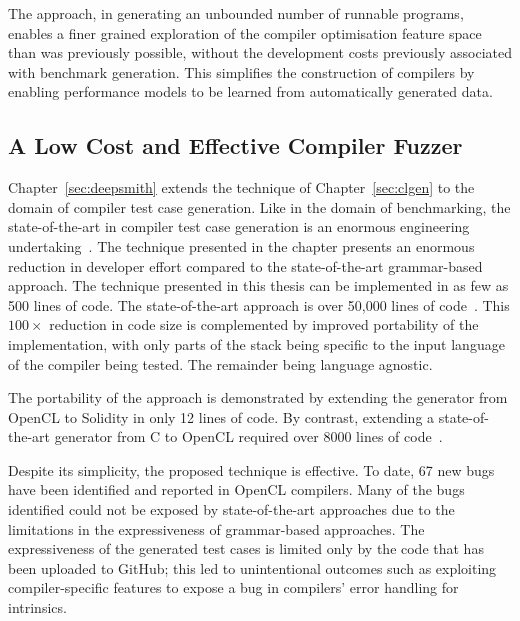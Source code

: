 The approach, in generating an unbounded number of runnable programs, enables a finer grained exploration of the compiler optimisation feature space than was previously possible, without the development costs previously associated with benchmark generation. This simplifies the construction of compilers by enabling performance models to be learned from automatically generated data.



\subsection{A Low Cost and Effective Compiler Fuzzer}

Chapter~\ref{sec:deepsmith} extends the technique of Chapter~\ref{sec:clgen} to the domain of compiler test case generation. Like in the domain of benchmarking, the state-of-the-art in compiler test case generation is an enormous engineering undertaking~\cite{Yang2011,Lidbury2015a}. The technique presented in the chapter presents an enormous reduction in developer effort compared to the state-of-the-art grammar-based approach. The technique presented in this thesis can be implemented in as few as 500 lines of code. The state-of-the-art approach is over 50,000 lines of code~\cite{Yang2011}. This $100\times$ reduction in code size is complemented by improved portability of the implementation, with only parts of the stack being specific to the input language of the compiler being tested. The remainder being language agnostic.

The portability of the approach is demonstrated by extending the generator from OpenCL to Solidity in only 12 lines of code. By contrast, extending a state-of-the-art generator from C to OpenCL required over 8000 lines of code~\cite{Lidbury2015a}.

Despite its simplicity, the proposed technique is effective. To date, 67 new bugs have been identified and reported in OpenCL compilers. Many of the bugs identified could not be exposed by state-of-the-art approaches due to the limitations in the expressiveness of grammar-based approaches. The expressiveness of the generated test cases is limited only by the code that has been uploaded to GitHub; this led to unintentional outcomes such as exploiting compiler-specific features to expose a bug in compilers' error handling for intrinsics.

